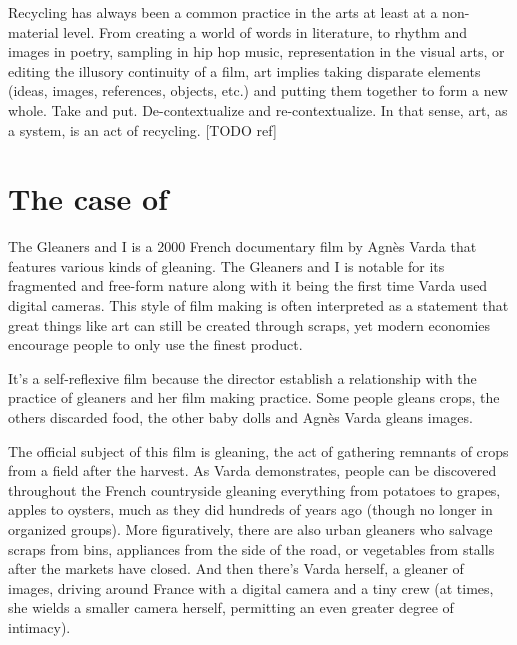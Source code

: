Recycling has always been a common practice in the arts at least at a non-material level. From creating a world of words in literature, to rhythm and images in poetry, sampling in hip hop music, representation in the visual arts, or editing the illusory continuity of a film, art implies taking disparate elements (ideas, images, references, objects, etc.) and putting them together to form a new whole. Take and put. De-contextualize and re-contextualize. In that sense, art, as a system, is an act of recycling. [TODO ref]

\section{The case of }
The Gleaners and I is a 2000 French documentary film by Agnès Varda that features various kinds of gleaning. The Gleaners and I is notable for its fragmented and free-form nature along with it being the first time Varda used digital cameras. This style of film making is often interpreted as a statement that great things like art can still be created through scraps, yet modern economies encourage people to only use the finest product.

It's a self-reflexive film because the director establish a relationship with the practice of gleaners and her film making practice. Some people gleans crops, the others discarded food, the other baby dolls and Agnès Varda gleans images.  


The official subject of this film is gleaning, the act of gathering remnants of crops from a field after the harvest. As Varda demonstrates, people can be discovered throughout the French countryside gleaning everything from potatoes to grapes, apples to oysters, much as they did hundreds of years ago (though no longer in organized groups). More figuratively, there are also urban gleaners who salvage scraps from bins, appliances from the side of the road, or vegetables from stalls after the markets have closed. And then there’s Varda herself, a gleaner of images, driving around France with a digital camera and a tiny crew (at times, she wields a smaller camera herself, permitting an even greater degree of intimacy).


